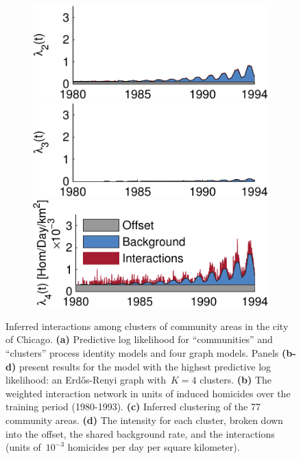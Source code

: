 \begin{figure}[!t]
\begin{center}
\begin{subfigure}[B]{.28\textwidth}
      \includegraphics[width=\linewidth]{figures/ch2/icpsr_rate2} \\ 
      \includegraphics[width=\linewidth]{figures/ch2/icpsr_rate3} \\
      \includegraphics[width=\linewidth]{figures/ch2/icpsr_rate4} 
      \label{fig:chicago_rates}
    \end{subfigure}
  \end{center}
\vspace{-1em}
\caption[Inferred gang interactions in the city of Chicago]{
  Inferred interactions among clusters of community areas in the city of Chicago.
  \textbf{(a)} Predictive log likelihood for ``communities'' and ``clusters''  process identity models and four graph models. 
  Panels \textbf{(b-d)} present results for the model with the highest predictive log likelihood: an Erd\H{o}s-Renyi graph with~${K=4}$ clusters.
  \textbf{(b)} The weighted interaction network in units of induced homicides over the training period (1980-1993).
  \textbf{(c)} Inferred clustering of the 77 community areas.
  \textbf{(d)} The intensity for each cluster, broken down into the offset, the shared background rate, and the interactions (units of~${10^{-3}}$ homicides per day per square kilometer).}
\label{fig:chicago}
\vspace{-1em}
\end{figure}
